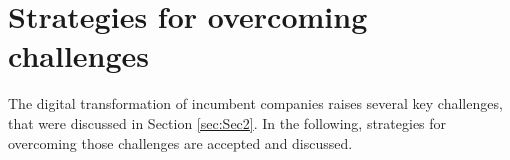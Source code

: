 \documentclass[a4]{scrartcl}
\begin{document}
	










\newpage
\section{Strategies for overcoming challenges} \label{sec:Sec3}


The digital transformation of incumbent companies raises several key challenges, that were discussed in Section \ref{sec:Sec2}. In the following, strategies for overcoming those challenges are accepted and discussed.
\end{document}
